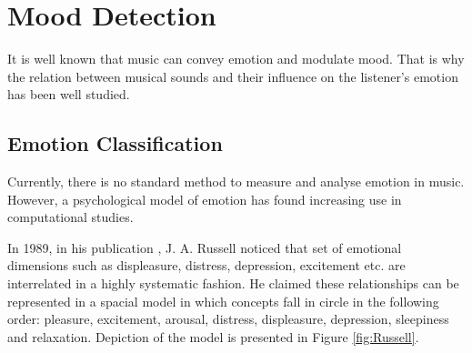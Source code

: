 \vspace{20pt}


\section{Mood Detection}


It is well known that music can convey emotion and modulate mood. That is why the relation between musical sounds and their influence on the listener’s emotion has been well studied.

\subsection{Emotion Classification}
\label{sec:emotionClass}

Currently, there is no standard method to measure and analyse emotion in music. However, a psychological model of emotion has found increasing use in computational studies. 

In 1989, in his publication \cite{Russell}, J. A. Russell noticed that set of emotional dimensions such as displeasure, distress, depression, excitement etc. are interrelated in a highly systematic fashion. He claimed these relationships can be represented in a spacial model in which concepts fall in circle in the following order: pleasure, excitement, arousal, distress, displeasure, depression, sleepiness and relaxation. Depiction of the model is presented in Figure \ref{fig:Russell}.

